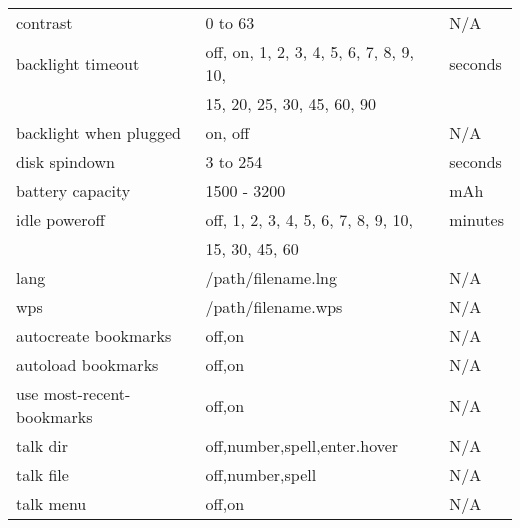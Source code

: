 \begin{center}
\begin{tabular}{@{}lll@{}}
     contrast & 0 to 63 & N/A\\
     backlight timeout & off, on, 1, 2, 3, 4, 5, 6, 7, 8, 9, 10, & seconds\\ 
                       & 15, 20, 25, 30, 45, 60, 90 & \\
     backlight when plugged & on, off & N/A\\
     disk spindown & 3 to 254 & seconds\\
     battery capacity & 1500 - 3200 & mAh\\
     idle poweroff & off, 1, 2, 3, 4, 5, 6, 7, 8, 9, 10, & minutes\\
                   & 15, 30, 45, 60 & \\
     lang & /path/filename.lng & N/A\\
     wps & /path/filename.wps & N/A\\
     autocreate bookmarks & off,on & N/A\\
     autoload bookmarks & off,on & N/A\\
     use most-recent-bookmarks & off,on & N/A\\
     talk dir & off,number,spell,enter.hover & N/A\\
     talk file & off,number,spell & N/A\\
     talk menu & off,on & N/A\\\bottomrule
  \end{tabular}
\end{center}


